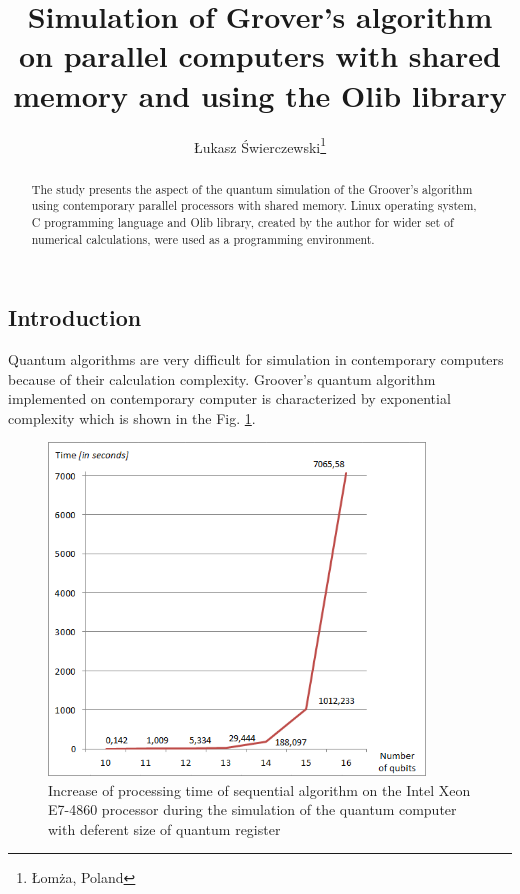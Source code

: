 \documentclass[10pt, a5paper]{article}
\begin{document}
\title{Simulation of Grover's algorithm on parallel computers with shared memory and using the Olib library}%

\author{\L{}ukasz \'{S}wierczewski\footnote{\L{}om\.z{}a, Poland}}
\maketitle

\begin{abstract}
The study presents the aspect of the quantum simulation of the Groover's algorithm using contemporary parallel processors with shared memory. Linux operating system, C programming language and Olib library, created by the author for wider set of numerical calculations, were used as a programming environment.
\end{abstract}


\subsection*{Introduction}

Quantum algorithms are very difficult for simulation in contemporary computers because of their calculation complexity. Groover's quantum algorithm implemented on contemporary computer is characterized by exponential complexity which is shown in the Fig. \ref{fig:lf1}.

\begin{figure}
  \centering
  \includegraphics[width=10cm]{18_2012_1.png}
  \caption{Increase of processing time of sequential algorithm on the Intel Xeon E7-4860  processor during the simulation of the quantum computer with deferent size of quantum register}
  \label{fig:lf1}
\end{figure}
\end{document}
